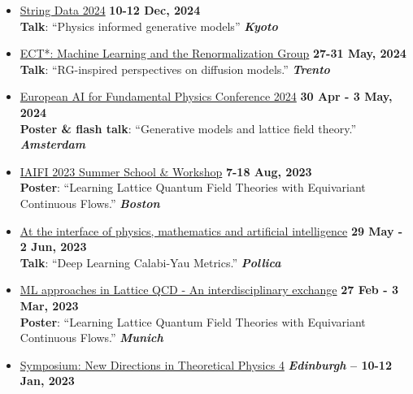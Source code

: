 \documentclass[11pt]{article}
\newcommand{\dateright}[1]{\hfill \textbf{#1}}
\begin{document}
\begin{itemize}[resume, itemsep=5pt]
    \item {\href{https://mlphys.scphys.kyoto-u.ac.jp/stringdata2024/}{String Data 2024}} \dateright{10-12 Dec, 2024} \\
    {\footnotesize \textbf{Talk}: “Physics informed generative models”} \dateright{{\color{black} \textit{Kyoto}}}

    \item {\href{https://indico.ectstar.eu/event/206/contributions/4799/}{ECT*: Machine Learning and the Renormalization Group}} \dateright{ 27-31 May, 2024} \\
    {\footnotesize \textbf{Talk}: “RG-inspired perspectives on diffusion models.”} \dateright{{\color{black}\textit{Trento}}}

    \item {\href{https://indico.nikhef.nl/event/4875/contributions/20373/}{European AI for Fundamental Physics Conference 2024}} \dateright{ 30 Apr - 3 May, 2024} \\
    {\footnotesize \textbf{Poster \& flash talk}: “Generative models and lattice field theory.”} \dateright{{\color{black}\textit{Amsterdam}}}

    \item {\href{https://iaifi.org/past-workshops.html}{IAIFI 2023 Summer School \& Workshop}} \dateright{ 7-18 Aug, 2023} \\
    {\footnotesize \textbf{Poster}: “Learning Lattice Quantum Field Theories with Equivariant Continuous Flows.”} \dateright{{\color{black}\textit{Boston}}}

    \item {\href{https://agenda.infn.it/event/33851/}{At the interface of physics, mathematics and artificial intelligence}} \dateright{ 29 May - 2 Jun, 2023} \\
    {\footnotesize \textbf{Talk}: “Deep Learning Calabi-Yau Metrics.”} \dateright{{\color{black}\textit{Pollica}}}

    \item {\href{https://indico.ph.tum.de/event/7116/}{ML approaches in Lattice QCD - An interdisciplinary exchange}} \dateright{ 27 Feb - 3 Mar, 2023} \\
    {\footnotesize \textbf{Poster}: “Learning Lattice Quantum Field Theories with Equivariant Continuous Flows.”} \dateright{{\color{black}\textit{Munich}}}

    \item {\href{https://indico.ph.ed.ac.uk/event/124/}{Symposium: New Directions in Theoretical Physics 4}} \dateright{{\color{black}\textit{Edinburgh} -- } 10-12 Jan, 2023}


\end{itemize}
\end{document}
